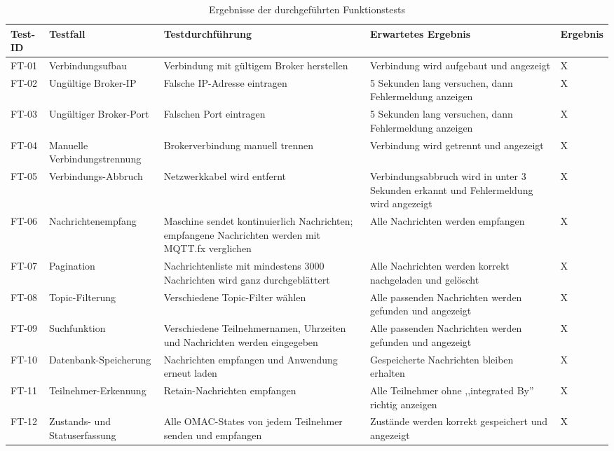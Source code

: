  \begin{longtable}{|p{1cm}|p{3cm}|p{4.0cm}|p{4.8cm}|p{2cm}|} \caption{Ergebnisse der durchgeführten Funktionstests} \label{tab:funktionstests} \\
    \hline \textbf{Test-ID} & \textbf{Testfall} & \textbf{Testdurchführung} & \textbf{Erwartetes Ergebnis} & \textbf{Ergebnis} \\ \hline FT-01 & Verbindungsuf\-bau & Verbindung mit gültigem Broker herstellen & Verbindung wird aufgebaut und angezeigt & X 
    \\ \hline FT-02 & Ungültige Broker-IP & Falsche IP-Adresse eintragen & 5 Sekunden lang versuchen, dann Fehlermeldung anzeigen & X 
    \\ \hline FT-03 & Ungültiger Broker-Port & Falschen Port eintragen & 5 Sekunden lang versuchen, dann Fehlermeldung anzeigen & X 
    \\ \hline FT-04 & Manuelle Verbindungstrennung & Brokerverbindung manuell trennen & Verbindung wird getrennt und angezeigt & X 
    \\ \hline FT-05 & Verbindungs-Abbruch & Netzwerkkabel wird entfernt & Verbindungsabbruch wird in unter 3 Sekunden erkannt und Fehlermeldung wird angezeigt & X 
    \\ \hline FT-06 & Nachrichten\-empfang & Maschine sendet kontinuierlich Nachrichten; empfangene Nachrichten werden mit MQTT.fx verglichen & Alle Nachrichten werden empfangen & X 
    \\ \hline FT-07 & Pagination & Nachrichtenliste mit mindestens 3000 Nachrichten wird ganz durchgeblättert & Alle Nachrichten werden korrekt nachgeladen und gelöscht & X 
    \\ \hline FT-08 & Topic-Filterung & Verschiedene Topic-Filter wählen & Alle passenden Nachrichten werden gefunden und angezeigt & X 
    \\ \hline FT-09 & Suchfunktion & Verschiedene Teilnehmernamen, Uhrzeiten und Nachrichten werden eingegeben & Alle passenden Nachrichten werden gefunden und angezeigt & X 
    \\ \hline FT-10 & Datenbank-Speicherung & Nachrichten empfangen und Anwendung erneut laden & Gespeicherte Nachrichten bleiben erhalten & X 
    \\ \hline FT-11 & Teilnehmer-Erkennung & Retain-Nachrichten empfangen & Alle Teilnehmer ohne ,,integrated By'' richtig anzeigen & X 
    \\ \hline FT-12 & Zustands- und Statuserfassung & Alle OMAC-States von jedem Teilnehmer senden und empfangen & Zustände werden korrekt gespeichert und angezeigt & X 

\end{longtable}
